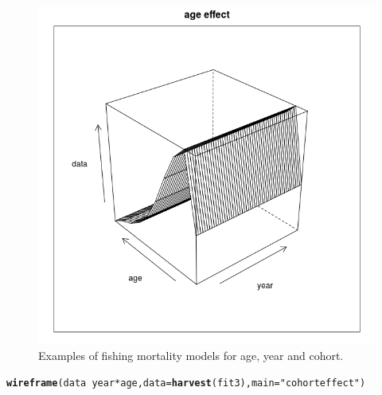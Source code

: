 \documentclass[a4paper,english,10pt]{article}\usepackage[]{graphicx}\usepackage[]{color}
\makeatletter
\def\maxwidth{ %
  \ifdim\Gin@nat@width>\linewidth
    \linewidth
  \else
    \Gin@nat@width
  \fi
}
\newcommand{\hlstr}[1]{\textcolor[rgb]{0.192,0.494,0.8}{#1}}%
\newcommand{\hlopt}[1]{\textcolor[rgb]{0,0,0}{#1}}%
\newcommand{\hlstd}[1]{\textcolor[rgb]{0.345,0.345,0.345}{#1}}%
\newcommand{\hlkwc}[1]{\textcolor[rgb]{0.333,0.667,0.333}{#1}}%
\newcommand{\hlkwd}[1]{\textcolor[rgb]{0.737,0.353,0.396}{\textbf{#1}}}%
\newenvironment{kframe}{%
 \def\at@end@of@kframe{}%
 \ifinner\ifhmode%
  \def\at@end@of@kframe{\end{minipage}}%
  \begin{minipage}{\columnwidth}%
 \fi\fi%
 \def\FrameCommand##1{\hskip\@totalleftmargin \hskip-\fboxsep
 \colorbox{shadecolor}{##1}\hskip-\fboxsep
     \hskip-\linewidth \hskip-\@totalleftmargin \hskip\columnwidth}%
 \MakeFramed {\advance\hsize-\width
   \@totalleftmargin\z@ \linewidth\hsize
   \@setminipage}}%
 {\par\unskip\endMakeFramed%
 \at@end@of@kframe}
\newenvironment{knitrout}{}{} %
\makeatother
\begin{document}
\begin{knitrout}
\begin{figure}[H]
{\centering \includegraphics[width=\maxwidth]{figure/majeff-2} 

}

\caption[Examples of fishing mortality models for age, year and cohort]{Examples of fishing mortality models for age, year and cohort.}\label{fig:majeff2}
\end{figure}

\begin{kframe}\begin{alltt}
\hlkwd{wireframe}\hlstd{(data} \hlopt{~} \hlstd{year} \hlopt{*} \hlstd{age,} \hlkwc{data} \hlstd{=} \hlkwd{harvest}\hlstd{(fit3),} \hlkwc{main} \hlstd{=} \hlstr{"cohort effect"}\hlstd{)}
\end{alltt}
\end{kframe}\begin{figure}[H]


\end{figure}
\end{knitrout}
\end{document}
